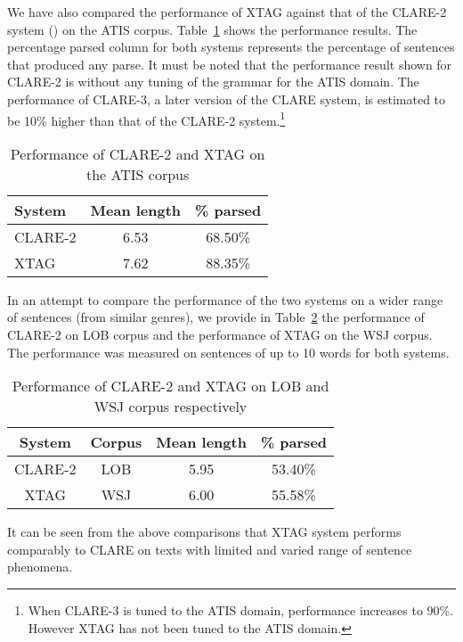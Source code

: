 We have also compared the performance of XTAG against that of the CLARE-2
system (\cite{clare-report92}) on the ATIS corpus. Table~\ref{clare-results}
shows the performance results. The percentage parsed column for both systems
represents the percentage of sentences that produced any parse.  It must be
noted that the performance result shown for CLARE-2 is without any tuning of
the grammar for the ATIS domain. The performance of CLARE-3, a later version of
the CLARE system, is estimated to be 10\% higher than that of the CLARE-2
system.\footnote{When CLARE-3 is tuned to the ATIS domain, performance
increases to 90\%. However XTAG has not been tuned to the ATIS domain.}

\begin{table}[ht]
\centering
\begin{tabular}{|l|c|c|}  \hline
System & Mean length & \% parsed \\ \hline
CLARE-2  & 6.53 & 68.50\% \\ \hline
XTAG  & 7.62 & 88.35\% \\ \hline
\end{tabular}
\caption{Performance of CLARE-2 and XTAG on the ATIS corpus}
\label{clare-results}
\end{table}


In an attempt to compare the performance of the two systems on a wider
range of sentences (from similar genres), we provide in
Table~\ref{clare-results1} the performance of CLARE-2 on LOB corpus
and the performance of XTAG on the WSJ corpus. The performance was
measured on sentences of up to 10 words for both systems.
\begin{table}[ht]
\centering
\begin{tabular}{|c|c|c|c|}  \hline
System & Corpus & Mean length & \% parsed \\ \hline
CLARE-2 & LOB & 5.95 & 53.40\% \\ \hline
XTAG & WSJ & 6.00 & 55.58\% \\ \hline
\end{tabular}
\caption{Performance of CLARE-2 and XTAG on LOB and WSJ corpus
respectively}
\label{clare-results1}
\end{table}

It can be seen from the above comparisons that XTAG system performs
comparably to CLARE on texts with limited and varied range of sentence
phenomena.
